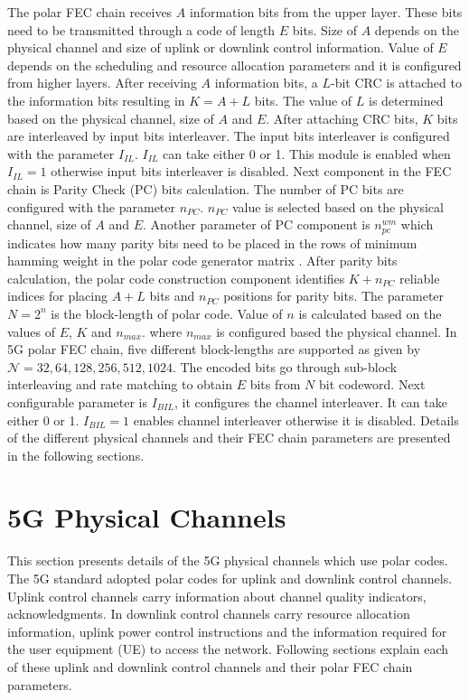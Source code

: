 The polar FEC chain receives $A$ information bits from the upper layer. These bits need to be transmitted through a code of length $E$ bits. Size of $A$ depends on the physical channel and size of uplink or downlink control information. Value of $ E $ depends on the scheduling and resource allocation parameters and it is configured from higher layers. After receiving $A$ information bits, a $L$-bit CRC is attached to the information bits resulting in $K = A + L$ bits. The value of $L$ is determined based on the physical channel, size of $A$ and $E$. After attaching CRC bits, $K$ bits are interleaved by input bits interleaver. The input bits interleaver is configured with the parameter $I_{IL}$. $I_{IL}$ can take either 0 or 1. This module is enabled when $I_{IL} = 1$ otherwise input bits interleaver is disabled. Next component in the FEC chain is Parity Check (PC) bits calculation. The number of PC bits are configured with the parameter $n_{PC}$. $n_{PC}$ value is selected based on the physical channel, size of $A$ and $E$. Another parameter of PC component is $n_{pc}^{wm}$ which indicates how many parity bits need to be placed in the rows of minimum hamming weight in the polar code generator matrix \cite{3gpp.38.212}. After parity bits calculation, the polar code construction component identifies  $K + n_{PC}$ reliable indices for placing $A+L$ bits and $n_{PC}$ positions for parity bits. The parameter $N = 2^n$ is the block-length of polar code. Value of $n$ is calculated based on the values of $E$, $K$ and $n_{max}$. where $n_{max}$ is configured based the physical channel. In 5G polar FEC chain, five different block-lengths are supported as given by $\mathcal{N} = {32,64,128,256,512,1024}$. The encoded bits go through sub-block interleaving and rate matching to obtain $E$ bits from $N$ bit codeword. Next configurable parameter is $I_{BIL}$, it configures the channel interleaver. It can take either 0 or 1. $I_{BIL} = 1$ enables channel interleaver otherwise it is disabled. Details of the different physical channels and their FEC chain parameters are presented in the following sections.

\section{5G Physical Channels}
This section presents details of the 5G physical channels which use polar codes. The 5G standard adopted polar codes for uplink and downlink control channels. Uplink control channels carry information about channel quality indicators, acknowledgments. In downlink control channels carry resource allocation information, uplink power control instructions and the information required for the user equipment (UE) to access the network. Following sections explain each of these uplink and downlink control channels and their polar FEC chain parameters.

